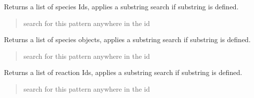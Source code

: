\documentclass[letterpaper,12pt,english]{sphinxmanual}
\begin{document}
\begin{fulllineitems}

\begin{fulllineitems}
\label{\detokenize{api/core:cbmpy.CBModel.Model.getSpeciesIds}}
\pysigstartsignatures
\pysiglinewithargsret
{}
{}
{}
\pysigstopsignatures
\sphinxAtStartPar
Returns a list of species Ids, applies a substring search if substring is defined.
\begin{quote}\begin{description}
\sphinxAtStartPar
{} \textendash{} search for this pattern anywhere in the id

\end{description}\end{quote}

\end{fulllineitems}


\begin{fulllineitems}
\label{\detokenize{api/core:cbmpy.CBModel.Model.getSpeciesObjects}}
\pysigstartsignatures
\pysiglinewithargsret
{}
{}
{}
\pysigstopsignatures
\sphinxAtStartPar
Returns a list of species objects, applies a substring search if substring is defined.
\begin{quote}\begin{description}
\sphinxAtStartPar
{} \textendash{} search for this pattern anywhere in the id

\end{description}\end{quote}

\end{fulllineitems}


\begin{fulllineitems}
\label{\detokenize{api/core:cbmpy.CBModel.Model.getReactionIds}}
\pysigstartsignatures
\pysiglinewithargsret
{}
{}
{}
\pysigstopsignatures
\sphinxAtStartPar
Returns a list of reaction Ids, applies a substring search if substring is defined.
\begin{quote}\begin{description}
\sphinxAtStartPar
{} \textendash{} search for this pattern anywhere in the id


\end{description}
\end{quote}
\end{fulllineitems}
\end{fulllineitems}
\end{document}
